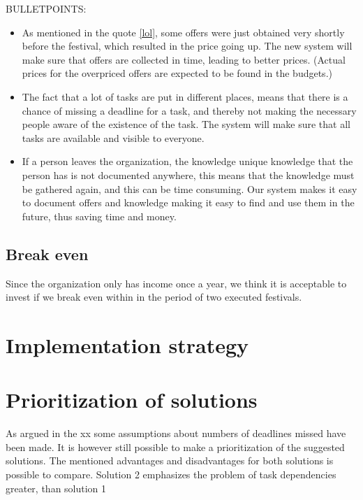 BULLETPOINTS:
\begin{itemize}
    \item As mentioned in the quote \ref{lol}, some offers were just obtained very shortly before
    the festival, which resulted in the price going up. The new system will make sure that offers
    are collected in time, leading to better prices. (Actual prices for the overpriced offers are
    expected to be found in the budgets.)
    \item The fact that a lot of tasks are put in different places, means that there is a chance of
    missing a deadline for a task, and thereby not making the necessary people aware of the
    existence of the task. The system will make sure that all tasks are available and visible to
    everyone.
    \item If a person leaves the organization, the knowledge unique knowledge that the person has is
    not documented anywhere, this means that the knowledge must be gathered again, and this can be
    time consuming. Our system makes it easy to document offers and knowledge making it easy to find
    and use them in the future, thus saving time and money.
\end{itemize}

\subsection{Break even}
\label{sub:break_even}
Since the organization only has income once a year, we think it is acceptable to invest if we break
even within in the period of two executed festivals.

\section{Implementation strategy}

\section{Prioritization of solutions}
As argued in the xx some assumptions about numbers of deadlines missed have been made. It is however still possible to make a prioritization of the suggested solutions.
The mentioned advantages and disadvantages for both solutions is possible to compare. Solution 2 emphasizes the problem of task dependencies greater, than solution 1

